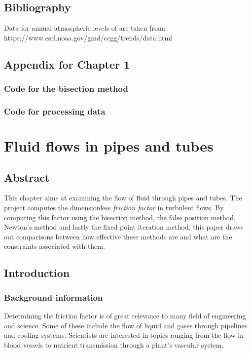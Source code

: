 \documentclass{book}
\begin{document}
	\section{Bibliography}
	Data for annual atmospheric levels of  are taken from: \\
	https://www.esrl.noaa.gov/gmd/ccgg/trends/data.html
	\newpage
	\section{Appendix for Chapter 1}
	\subsection{Code for the bisection method}
	
	\subsection{Code for processing data}
	

	\chapter{Fluid flows in pipes and tubes}
	\section{Abstract}
	This chapter aims at examining the flow of fluid through pipes and tubes. The project computes the dimensionless \textit{friction factor} in turbulent flows. By computing this factor using the bisection method, the false position method, Newton's method and lastly the fixed point iteration method, this paper draws out comparisons between how effective these methods are and what are the constraints associated with them.
	
	\section{Introduction}
	
	\subsection{Background information}
	Determining the friction factor is of great relevance to many field of engineering and science. Some of these include the flow of liquid and gases through pipelines and cooling systems. Scientists are interested in topics ranging from the flow in blood vessels to nutrient transmission through a plant's vascular system.
	
\end{document}
